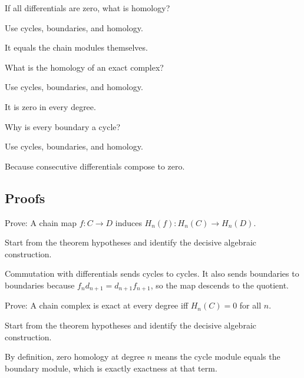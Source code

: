 \begin{exercise}\label{exr:v22-expand-03}
If all differentials are zero, what is homology?
\end{exercise}
\begin{hint}
Use cycles, boundaries, and homology.
\end{hint}
\begin{solution}
It equals the chain modules themselves.
\end{solution}

\begin{exercise}\label{exr:v22-expand-04}
What is the homology of an exact complex?
\end{exercise}
\begin{hint}
Use cycles, boundaries, and homology.
\end{hint}
\begin{solution}
It is zero in every degree.
\end{solution}

\begin{exercise}\label{exr:v22-expand-05}
Why is every boundary a cycle?
\end{exercise}
\begin{hint}
Use cycles, boundaries, and homology.
\end{hint}
\begin{solution}
Because consecutive differentials compose to zero.
\end{solution}

\subsection*{Proofs}

\begin{exercise}\label{exr:v22-expand-06}
Prove: A chain map $f:C\to D$ induces $H_n(f):H_n(C)\to H_n(D)$.
\end{exercise}
\begin{hint}
Start from the theorem hypotheses and identify the decisive algebraic construction.
\end{hint}
\begin{solution}
Commutation with differentials sends cycles to cycles. It also sends boundaries to boundaries because $f_n d_{n+1}=d_{n+1}f_{n+1}$, so the map descends to the quotient.
\end{solution}

\begin{exercise}\label{exr:v22-expand-07}
Prove: A chain complex is exact at every degree iff $H_n(C)=0$ for all $n$.
\end{exercise}
\begin{hint}
Start from the theorem hypotheses and identify the decisive algebraic construction.
\end{hint}
\begin{solution}
By definition, zero homology at degree $n$ means the cycle module equals the boundary module, which is exactly exactness at that term.
\end{solution}

